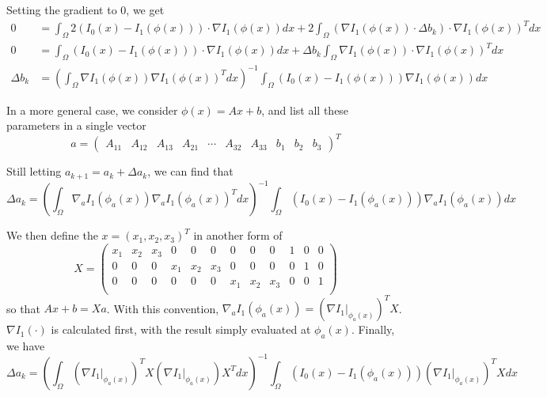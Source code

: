 \documentclass{article}
\theoremstyle{definition}
\theoremstyle{plain}
\begin{document}
Setting the gradient to 0, we get
\begin{align*}
    0&=\int_\Omega2(I_0(x)-I_1(\phi(x)))\cdot\nabla I_1(\phi(x))dx+2\int_\Omega(\nabla I_1(\phi(x))\cdot\Delta b_k)\cdot\nabla I_1(\phi(x))^T dx\\
    0&=\int_\Omega(I_0(x)-I_1(\phi(x)))\cdot\nabla I_1(\phi(x))dx+\Delta b_k\int_\Omega\nabla I_1(\phi(x))\cdot\nabla I_1(\phi(x))^T dx\\
    \Delta b_k&=\left(\int_\Omega\nabla I_1(\phi(x))\nabla I_1(\phi(x))^Tdx\right)^{-1}\int_\Omega(I_0(x)-I_1(\phi(x)))\nabla I_1(\phi(x))dx
\end{align*}

In a more general case, we consider $\phi(x)=Ax+b$, and list all these parameters in a single vector
\begin{equation*}
    a =
    \begin{pmatrix}
    A_{11} & A_{12} & A_{13} & A_{21} & \cdots & A_{32} & A_{33} & b_1 & b_2 & b_3
    \end{pmatrix}^T
\end{equation*}

Still letting $a_{k+1}=a_k+\Delta a_k$, we can find that
\begin{equation*}
    \Delta a_k=\left(\int_\Omega\nabla_a I_1(\phi_a(x))\nabla_aI_1(\phi_a(x))^Tdx\right)^{-1}\int_\Omega(I_0(x)-I_1(\phi_a(x)))\nabla_aI_1(\phi_a(x))dx
\end{equation*}

We then define the $x=(x_1,x_2,x_3)^T$ in another form of
\begin{equation*}
    X=
    \begin{pmatrix}
    x_1 & x_2 & x_3 & 0 & 0 & 0 & 0 & 0 & 0 & 1 & 0 & 0\\
    0 & 0 & 0 & x_1 & x_2 & x_3 & 0 & 0 & 0 & 0 & 1 & 0\\
    0 & 0 & 0 & 0 & 0 & 0 & x_1 & x_2 & x_3 & 0 & 0 & 1\\
    \end{pmatrix}
\end{equation*}
so that $Ax+b=Xa$. With this convention, $\nabla_aI_1(\phi_a(x))=(\nabla I_1|_{\phi_a(x)})^TX$. $\nabla I_1(\cdot)$ is calculated first, with the result simply evaluated at $\phi_a(x)$. Finally, we have
\begin{equation*}
    \Delta a_k=\left(\int_\Omega(\nabla I_1|_{\phi_a(x)})^TX(\nabla I_1|_{\phi_a(x)})X^Tdx\right)^{-1}\int_\Omega(I_0(x)-I_1(\phi_a(x)))(\nabla I_1|_{\phi_a(x)})^TXdx
\end{equation*}
\end{document}
